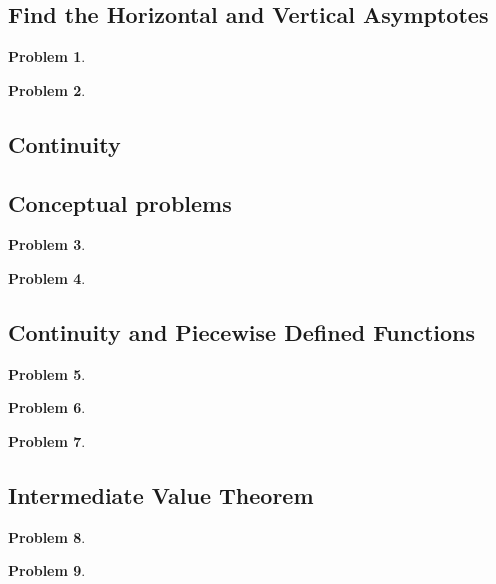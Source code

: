 \documentclass{article}
\newtheorem{problem}{Problem}
\begin{document}
\subsection{Find the Horizontal and Vertical Asymptotes}\label{secMPShorAndVertAsymptotes}
\begin{problem}

\end{problem}


\begin{problem}

\end{problem}

\subsection{Continuity}
\subsection{Conceptual problems} \label{secMPScontinuityConceptual}
\begin{problem}

\end{problem}
\begin{problem}

\end{problem}
\subsection{Continuity and Piecewise Defined Functions} \label{secMPScontinuityPiecewise}
\begin{problem}

\end{problem}
\begin{problem}

\end{problem}
\begin{problem}

\end{problem}
\subsection{Intermediate Value Theorem}\label{secMPSintermediateValueTheorem}
\begin{problem}

\end{problem}
\begin{problem}

\end{problem}

\end{document}
